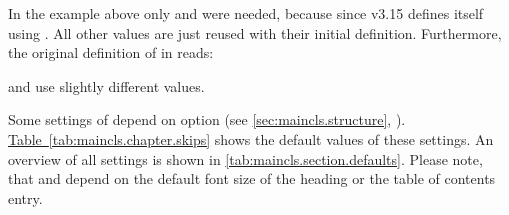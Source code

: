 In the example above only  and  were
needed, because since v3.15 \KOMAScript{} defines  itself
using . All other values are just reused
with their initial definition. Furthermore, the original definition of
 in  reads:
\begin{lstcode}[belowskip=\dp\strutbox]
\end{lstcode}
 and  use slightly different values.

Some settings of  depend on option  (see
\autoref{sec:maincls.structure},
). \hyperref[tab:maincls.chapter.skips]{Table~\ref*{tab:maincls.chapter.skips}}
shows the default values of these settings. An overview of all settings is
shown in \autoref{tab:maincls.section.defaults}. Please note, that 
\PValue{1ex} and  depend on the default font size
of the heading or the table of contents entry.%
%

